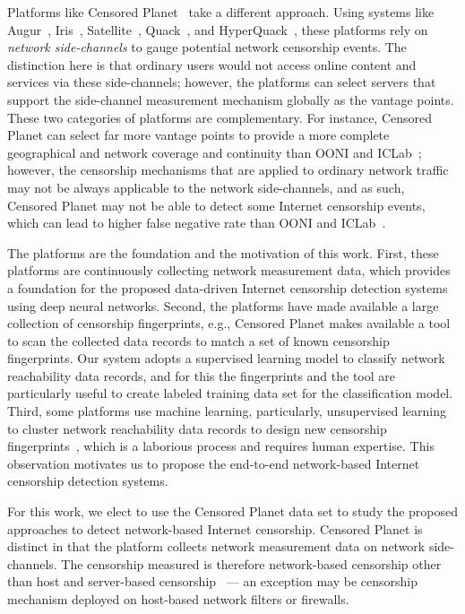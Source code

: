Platforms like Censored
Planet~\cite{sundara_raman_censored_2020} take a different approach. Using systems like
Augur~\cite{pearce2017augur}, Iris~\cite{pearce2017global},
Satellite~\cite{scott2016satellite}, Quack~\cite{vandersloot2018quack}, and
HyperQuack~\cite{raman_measuring_2020}, these platforms rely on {\em network side-channels} to
gauge potential network censorship events. The distinction here is that
ordinary users would not access online content and services via these
side-channels; however, the platforms can select servers that support the
side-channel measurement mechanism globally as the vantage points.  These two
categories of platforms are complementary. For instance, Censored Planet can
select far more vantage points to provide a more complete geographical and
network coverage and continuity than OONI and
ICLab~\cite{sundara_raman_censored_2020}; however, the censorship mechanisms
that are applied to ordinary network traffic may not be always applicable to
the network side-channels, and as such, Censored Planet may not be able to
detect some Internet censorship events, which can lead to higher false negative
rate than OONI and ICLab~\cite{niaki2020iclab}.  

The platforms are the foundation and the motivation of this work. First, these
platforms are continuously collecting network measurement data, which provides
a foundation for the proposed data-driven Internet
censorship detection systems using deep neural networks. Second, the platforms have made available 
a large collection of censorship fingerprints, e.g., Censored Planet makes
available a tool to scan the collected data records to match a set of known
censorship fingerprints. Our system adopts a supervised learning model to
classify network reachability data records, and for this the fingerprints and
the tool are particularly useful to create labeled training data set 
for the classification model.
Third, some platforms use machine learning, particularly, unsupervised
learning to cluster network reachability data records to design new censorship
fingerprints~\cite{raman_measuring_2020, niaki2020iclab}, which is a 
laborious process and requires human expertise. This
observation motivates us to propose the end-to-end network-based
Internet censorship detection systems. 

For this work, we elect to use the Censored Planet data set to study the
proposed approaches to detect network-based Internet censorship.  Censored Planet
is distinct in that the
platform collects network measurement data on network side-channels.  The
censorship measured is therefore network-based censorship other than
host and server-based censorship~\cite{aceto_internet_2015} --- an exception may 
be censorship mechanism deployed on host-based network filters or firewalls.  

